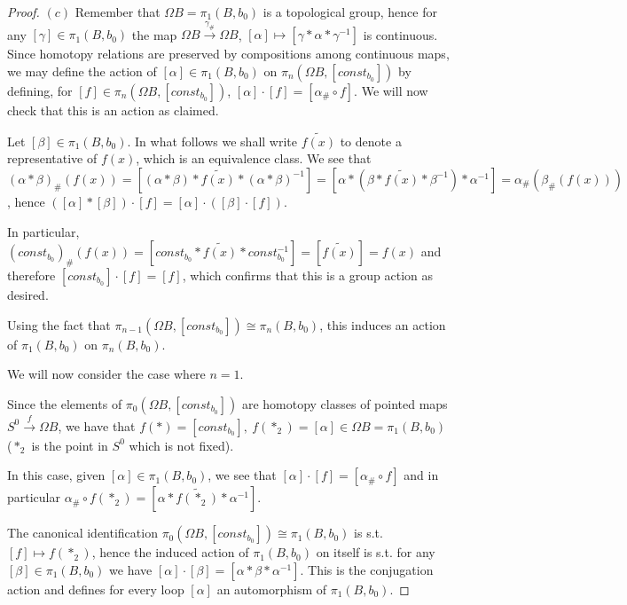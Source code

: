 \documentclass{article}
\begin{document}
\begin{proof}
    $(c)$ Remember that $\Omega B=\pi_1(B,b_0)$ is a topological group, hence
    for any $[\gamma]\in\pi_1(B,b_0)$ the map $\Omega
    B\xrightarrow{\gamma_\#}\Omega B$, $[\alpha]\mapsto 
    [\gamma*\alpha*\gamma^{-1}]$ is continuous. Since homotopy relations are
    preserved by compositions among continuous
    maps, we may define the action of $[\alpha]\in\pi_1(B,b_0)$ on $\pi_n(\Omega
    B,[const_{b_0}])$ by defining, for $[f]\in\pi_n(\Omega B,[const_{b_0}])$,
    $[\alpha]\cdot [f]=[\alpha_\#\circ f]$. We will now check that this is an
    action as claimed.

    Let $[\beta]\in\pi_1(B,b_0)$. In what follows we shall write $\tilde{f(x)}$
    to denote a representative of $f(x)$, which is an equivalence class. We see
    that
    $(\alpha*\beta)_\#(f(x))=[(\alpha*\beta)*\tilde{f(x)}*(\alpha*\beta)^{-1}]=
[\alpha*(\beta*\tilde{f(x)}*\beta^{-1})*\alpha^{-1}]=\alpha_\#(\beta_\#(f(x)))$, hence
    $([\alpha]*[\beta])\cdot [f]=[\alpha]\cdot ([\beta]\cdot [f])$.

    In particular,
    $(const_{b_0})_\#(f(x))=[const_{b_0}*\tilde{f(x)}*const_{b_0}^{-1}]=[\tilde{f(x)}]=f(x)$
    and therefore $[const_{b_0}]\cdot [f]=[f]$,
    which confirms that this is a group action as desired.
    
    Using the fact that $\pi_{n-1}(\Omega B,[const_{b_0}])\cong\pi_n(B,b_0)$,
    this induces an action of $\pi_1(B,b_0)$ on $\pi_n(B,b_0)$.

    We will now consider the case where $n=1$.
    
    Since the elements of $\pi_0(\Omega B,[const_{b_0}])$ are homotopy classes
    of pointed maps $S^0\xrightarrow{f}\Omega B$, we have that
    $f(*)=[const_{b_0}],\ f(*_2)=[\alpha]\in\Omega
    B=\pi_1(B,b_0)$ ($*_2$ is the point in $S^0$ which is not fixed).

    In this case, given $[\alpha]\in\pi_1(B,b_0)$, we see that
    $[\alpha]\cdot[f]=[\alpha_\#\circ f]$ and in particular $\alpha_\#\circ
    f(*_2)=[\alpha*\tilde{f(*_2)}*\alpha^{-1}]$.

    The canonical identification $\pi_0(\Omega
    B,[const_{b_0}])\cong\pi_1(B,b_0)$ is s.t. $[f]\mapsto f(*_2)$, hence the
    induced action of $\pi_1(B,b_0)$ on itself is s.t. for
    any $[\beta]\in\pi_1(B,b_0)$ we have
    $[\alpha]\cdot[\beta]=[\alpha*\beta*\alpha^{-1}]$. This is
    the conjugation action and defines for every loop $[\alpha]$ an automorphism
    of $\pi_1(B,b_0)$.
\end{proof}

\printbibliography
\end{document}
